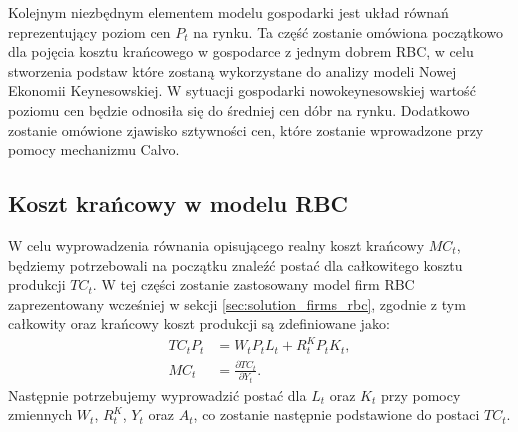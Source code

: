 Kolejnym niezbędnym elementem modelu gospodarki jest układ równań reprezentujący poziom cen $P_t$ na rynku. Ta część zostanie omówiona początkowo dla pojęcia kosztu krańcowego w gospodarce z jednym dobrem RBC, w celu stworzenia podstaw  które zostaną wykorzystane do analizy modeli Nowej Ekonomii Keynesowskiej. W sytuacji gospodarki nowokeynesowskiej wartość poziomu cen będzie odnosiła się do średniej cen dóbr na rynku. Dodatkowo zostanie omówione zjawisko sztywności cen, które zostanie wprowadzone przy pomocy mechanizmu Calvo.

\subsection{Koszt krańcowy w modelu RBC}
\label{sec:rbc_price_level}

W celu wyprowadzenia równania opisującego realny koszt krańcowy $MC_t$, będziemy potrzebowali na początku znaleźć postać dla całkowitego kosztu produkcji $TC_t$. W tej części zostanie zastosowany model firm RBC zaprezentowany wcześniej w sekcji \ref{sec:solution_firms_rbc}, zgodnie z tym całkowity oraz krańcowy koszt produkcji są zdefiniowane jako:
\begin{align}
    TC_t P_t &= W_t P_t L_t + R^K_t P_t K_t, \label{priceLevel:tc}\\
    MC_t &= \frac{\partial TC_t}{\partial Y_t}. \label{priceLevel:mc}
\end{align}
Następnie potrzebujemy wyprowadzić postać dla $L_t$ oraz $K_t$ przy pomocy zmiennych $W_t$, $R^K_t$, $Y_t$ oraz $A_t$, co zostanie następnie podstawione do postaci $TC_t$. 

